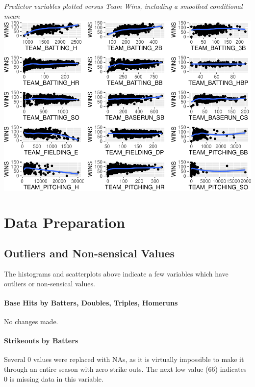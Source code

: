 \documentclass[]{article}
\let\oldparagraph\paragraph
\renewcommand{\paragraph}[1]{\oldparagraph{#1}\mbox{}}
\begin{document}
\emph{Predictor variables plotted versus Team Wins, including a smoothed
conditional mean}\\
\includegraphics{DATA621-Homework-1_files/figure-latex/unnamed-chunk-5-1.pdf}

\section{Data Preparation}\label{data-preparation}

\subsection{Outliers and Non-sensical
Values}\label{outliers-and-non-sensical-values}

The histograms and scatterplots above indicate a few variables which
have outliers or non-sensical values.

\paragraph{Base Hits by Batters, Doubles, Triples,
Homeruns}\label{base-hits-by-batters-doubles-triples-homeruns}

No changes made.

\paragraph{Strikeouts by Batters}\label{strikeouts-by-batters}

Several 0 values were replaced with NAs, as it is virtually impossible
to make it through an entire season with zero strike outs. The next low
value (66) indicates 0 is missing data in this variable.
\end{document}
